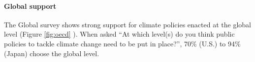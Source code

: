 
\paragraph{Global support}\label{subsubsec:global_support} %

The Global survey shows strong support for climate policies enacted at the global level (Figure \ref{fig:oecd}%
). %
When asked ``At which level(s) do you think public policies to tackle climate change need to be put in place?'', 70\% (U.S.) to 94\% (Japan) choose the global level. 


